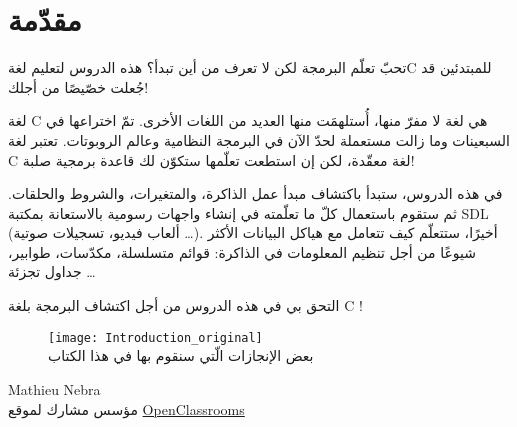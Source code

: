 \chapter*{مقدّمة}

\vspace{-0.6em}
تحبّ تعلّم البرمجة لكن لا تعرف من أين تبدأ؟ هذه الدروس لتعليم لغة\textenglish{C}
للمبتدئين قد جُعلت خصّيصًا من أجلك!

\vspace{-0.1em}
لغة \textenglish{C}
هي لغة لا مفرّ منها، أُستلهمَت منها العديد من اللغات الأخرى. تمّ اختراعها في السبعينات وما زالت مستعملة لحدّ الآن في البرمجة النظامية وعالم الروبوتات. تعتبر لغة \textenglish{C}
لغة معقّدة، لكن إن استطعت تعلّمها ستكوّن لك قاعدة برمجية صلبة!

\vspace{-0.1em}
في هذه الدروس، ستبدأ باكتشاف مبدأ عمل الذاكرة، والمتغيرات، والشروط والحلقات. ثم ستقوم باستعمال كلّ ما تعلّمته في إنشاء واجهات رسومية بالاستعانة بمكتبة
\textenglish{SDL}
 (ألعاب فيديو، تسجيلات صوتية \dots). أخيرًا، ستتعلّم كيف تتعامل مع هياكل البيانات الأكثر شيوعًا من أجل تنظيم المعلومات في الذاكرة: قوائم متسلسلة، مكدّسات، طوابير، جداول تجزئة \dots

\vspace{-0.1em}
التحق بي في هذه الدروس من أجل اكتشاف البرمجة بلغة \textenglish{C} !

\begin{figure}[H]
	\centering
	\texttt{[image: Introduction\_original]}\\
\small بعض الإنجازات الّتي سنقوم بها في هذا الكتاب
\end{figure}

\vfill
\hfill\parbox{0.3\textwidth}{\centering \textenglish{Mathieu Nebra}\\[0.2em]
مؤسس مشارك لموقع
\href{http://openclassrooms.com/}{\textenglish{OpenClassrooms}}
}
